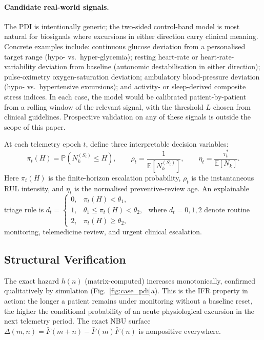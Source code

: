 \documentclass[pdflatex,sn-mathphys-num]{sn-jnl}
\theoremstyle{definition}
\newcommand{\Prob}{\mathbb{P}}
\newcommand{\E}{\mathbb{E}}
\numberwithin{equation}{section}
\begin{document}
\paragraph{Candidate real-world signals.}\label{sec:case_signals} The PDI is intentionally generic; the two-sided control-band model is most natural for biosignals where excursions in either direction carry clinical meaning. Concrete examples include: continuous glucose deviation from a personalised target range (hypo- vs.\ hyper-glycemia); resting heart-rate or heart-rate-variability deviation from baseline (autonomic destabilisation in either direction); pulse-oximetry oxygen-saturation deviation; ambulatory blood-pressure deviation (hypo- vs.\ hypertensive excursions); and activity- or sleep-derived composite stress indices. In each case, the model would be calibrated patient-by-patient from a rolling window of the relevant signal, with the threshold $L$ chosen from clinical guidelines. Prospective validation on any of these signals is outside the scope of this paper.

At each telemetry epoch \(t\), define three interpretable decision variables:
\[
\pi_t(H)=\Prob(N_k^{(S_t)}\le H),
\qquad
\rho_t=\frac{1}{\E[N_k^{(S_t)}]},
\qquad
\eta_t=\frac{\tau_t^*}{\E[N_k]}.
\]
Here \(\pi_t(H)\) is the finite-horizon escalation probability,
\(\rho_t\) is the instantaneous RUL intensity, and \(\eta_t\) is the
normalised preventive-review age. An explainable triage rule is
$\displaystyle d_t=
\begin{cases}
0, & \pi_t(H)<\theta_1,\\
1, & \theta_1\le \pi_t(H)<\theta_2,\\
2, & \pi_t(H)\ge \theta_2,
\end{cases}$
where \(d_t=0,1,2\) denote routine monitoring, telemedicine review, and urgent
clinical escalation.

\subsection{Structural Verification}

The exact hazard $h(n)$ (matrix-computed) increases monotonically, confirmed qualitatively by simulation (Fig.~\ref{fig:case_pdi}a). This is the IFR property in action: the longer a patient remains under monitoring without a baseline reset, the higher the conditional probability of an acute physiological excursion in the next telemetry period. The exact NBU surface $\Delta(m,n)=\bar{F}(m{+}n)-\bar{F}(m)\bar{F}(n)$ is nonpositive everywhere.
\end{document}
